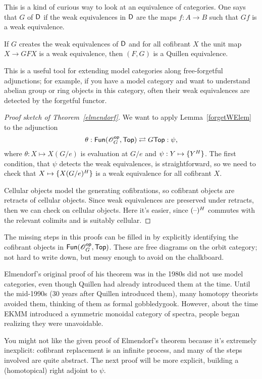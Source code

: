 This is a kind of curious way to look at an equivalence of categories. One says that $G$  of $\mathsf D$ if the weak equivalences in $\mathsf D$ are the maps $f:A\to B$ such that $Gf$ is a weak
equivalence.
\begin{lem}
\label{forgetWElem}
If $G$ creates the weak equivalences of $\mathsf D$ and for all cofibrant $X$ the unit map $X\to GFX$ is a weak
equivalence, then $(F,G)$ is a Quillen equivalence.
\end{lem}
This is a useful tool for extending model categories along free-forgetful adjunctions; for example, if you have a
model category and want to understand abelian group or ring objects in this category, often their weak equivalences
are detected by the forgetful functor.
\begin{proof}[Proof sketch of Theorem~\ref{elmendorf}]
We want to apply Lemma~\ref{forgetWElem} to the adjunction
\[\theta: \mathsf{Fun}(\mathscr O_G^{\mathsf{op}}, \mathsf{Top})\rightleftarrows G\mathsf{Top}: \psi,\]
where $\theta:X\mapsto X(G/e)$ is evaluation at $G/e$ and $\psi:Y\mapsto\set{Y^H}$. The first condition, that
$\psi$ detects the weak equivalences, is straightforward, so we need to check that $X\mapsto\set{X(G/e)^H}$ is a
weak equivalence for all cofibrant $X$.

Cellular objects model the generating cofibrations, so cofibrant objects are retracts of cellular objects. Since
weak equivalences are preserved under retracts, then we can check on cellular objects. Here it's easier, since
$(\text{--})^H$ commutes with the relevant colimits and is suitably cellular.
\end{proof}
The missing steps in this proofs can be filled in by explicitly identifying the cofibrant objects in
$\mathsf{Fun}(\mathscr O_G^{\mathsf{op}}, \mathsf{Top})$. These are free diagrams on the orbit category; not hard to write down, but messy enough to
avoid on the chalkboard.
\begin{rem}
Elmendorf's original proof of his theorem was in the 1980s did not use model categories, even though Quillen had
already introduced them at the time. Until the mid-1990s (30 years after Quillen introduced them), many homotopy
theorists avoided them, thinking of them as formal gobbledygook. However, about the time EKMM introduced a
symmetric monoidal category of spectra, people began realizing they were unavoidable.
\end{rem}
You might not like the given proof of Elmendorf's theorem because it's extremely inexplicit: cofibrant replacement
is an infinite process, and many of the steps involved are quite abstract. The next proof will be more explicit,
building a (homotopical) right adjoint to $\psi$.

